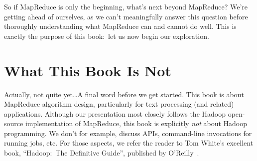 So if MapReduce is only the beginning, what's next beyond MapReduce?
We're getting ahead of ourselves, as we can't meaningfully answer this
question before thoroughly understanding what MapReduce can and cannot
do well.  This is exactly the purpose of this book:\ let us now begin
our exploration.

\section{What This Book Is Not}

Actually, not quite yet\ldots A final word before we get started.
This book is about MapReduce algorithm design, particularly for text
processing (and related) applications.  Although our presentation most
closely follows the Hadoop open-source implementation of MapReduce,
this book is explicitly {\it not} about Hadoop programming.  We don't
for example, discuss APIs, command-line invocations for running jobs,
etc.  For those aspects, we refer the reader to Tom White's excellent
book, ``Hadoop:\ The Definitive Guide'', published by
O'Reilly~\cite{White_2009}.
